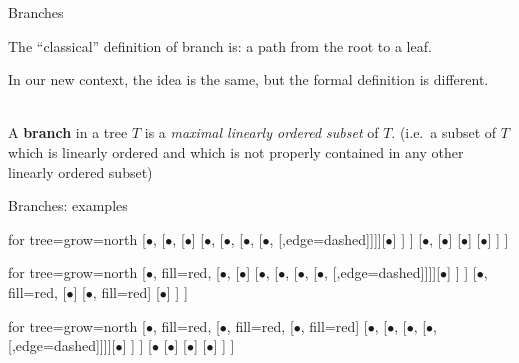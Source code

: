 \documentclass{beamer}
\theoremstyle{num.custom-title}
\theoremstyle{custom-title}
\renewcommand{\emph}[1]{\textbf{#1}}
\begin{document}
\begin{frame}{Branches}

The ``classical'' definition of branch is: a path from the root to a leaf.

In our new context, the idea is the same, but the formal definition is different.\\
\ 
\begin{definition}
A \emph{branch} in a tree $T$ is a \textit{maximal linearly ordered subset} of $T$. (i.e.\ a subset of $T$ which is linearly ordered and which is not properly contained in any other linearly ordered subset)
\end{definition}

\end{frame}


\begin{frame}{Branches: examples}

\vspace{10pt}

\begin{overprint}

\begin{center}
\begin{forest}
 for tree={grow=north}
	[$\bullet$, 
 		[$\bullet$, 
 			[$\bullet$]
 			[$\bullet$, 
 				[$\bullet$, [$\bullet$, [$\bullet$, [,edge=dashed]]]][$\bullet$]
 			]
 		]
 		[$\bullet$, 
 			[$\bullet$]
 			[$\bullet$]
 			[$\bullet$]
 		]
	]
\end{forest}
\end{center}


\begin{center}
\begin{forest}
 for tree={grow=north}
	[$\bullet$, fill=red, 
 		[$\bullet$, 
 			[$\bullet$]
 			[$\bullet$, 
 				[$\bullet$, [$\bullet$, [$\bullet$, [,edge=dashed]]]][$\bullet$]
 			]
 		]
 		[$\bullet$, fill=red, 
 			[$\bullet$]
 			[$\bullet$, fill=red]
 			[$\bullet$]
 		]
	]
\end{forest}
\end{center}
\scalebox{1.3}{\textcolor{red}{A branch.}}


\begin{center}
\begin{forest}
 for tree={grow=north}
	[$\bullet$, fill=red, 
 		[$\bullet$, fill=red, 
 			[$\bullet$, fill=red]
 			[$\bullet$, 
 				[$\bullet$, [$\bullet$, [$\bullet$, [,edge=dashed]]]][$\bullet$]
 			]
 		]
 		[$\bullet$
 			[$\bullet$]
 			[$\bullet$]
 			[$\bullet$]
 		]
	]
\end{forest}
\end{center}
\scalebox{1.3}{\textcolor{red}{Another branch.}}



\end{overprint}
\end{frame}
\end{document}
